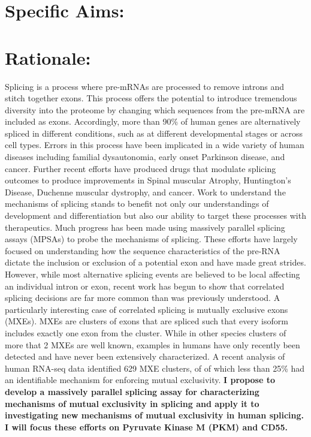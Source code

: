 \documentclass{article}
\begin{document}
\section*{Specific Aims:}
%
\section*{Rationale: } 
Splicing is a process where pre-mRNAs are processed to remove introns and stitch together exons. 
This process offers the potential to introduce tremendous diversity into the proteome by changing which sequences from the pre-mRNA are included as exons.
Accordingly, more than 90\% of human genes are alternatively spliced in different conditions, such as at different developmental stages or across cell types.\cite{Wang2008-ej} 
Errors in this process have been implicated in a wide variety of human diseases including familial dysautonomia, early onset Parkinson disease, and cancer.\cite{Scotti2015-yp} 
Further recent efforts have produced drugs that modulate splicing outcomes to produce improvements in Spinal muscular Atrophy, Huntington's Disease, Duchenne muscular dystrophy, and cancer.\cite{Neil2022-vf}
Work to understand the mechanisms of splicing stands to benefit not only our understandings of development and differentiation but also our ability to target these processes with therapeutics.
Much progress has been made using massively parallel splicing assays (MPSAs) to probe the mechanisms of splicing.\cite{Ke2018-af, Julien2016-wa, Adamson2018-va, Soemedi2017-pz, Cortes-Lopez2022-gy, Schirman2021-ss, Mikl2019-ng, Braun2018-mb, Soucek2019-iq, Baeza-Centurion2020-tn, Cheung2019-ah, Baeza-Centurion2019-hz, Rosenberg2015-zs, Wong2018-vq} 
These efforts have largely focused on understanding how the sequence characteristics of the pre-RNA dictate the inclusion or exclusion of a potential exon and have made great strides.
However, while most alternative splicing events are believed to be local affecting an individual intron or exon, recent work has begun to show that correlated splicing decisions are far more common than was previously understood.\cite{Zhu2021-fs, Tilgner2015-sb, Hatje2017-oj} 
A particularly interesting case of correlated splicing is mutually exclusive exons (MXEs). 
MXEs are clusters of exons that are spliced such that every isoform includes exactly one exon from the cluster. 
While in other species clusters of more that 2 MXEs are well known, examples in humans have only recently been detected and have never been extensively characterized.\cite{Jin2018-tq, Hatje2017-oj} 
A recent analysis of human RNA-seq data identified 629 MXE clusters, of of which less than 25\% had an identifiable mechanism for enforcing mutual exclusivity.\cite{Hatje2017-oj} 
\textbf{I propose to develop a massively parallel splicing assay for characterizing mechanisms of mutual exclusivity in splicing and apply it to investigating new mechanisms of mutual exclusivity in human splicing. I will focus these efforts on Pyruvate Kinase M (PKM) and CD55.} 
\\
\end{document}
